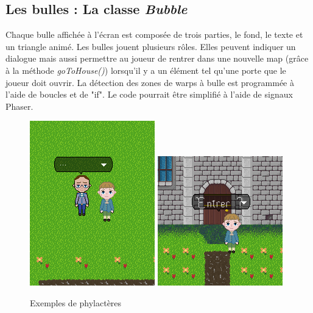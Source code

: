 \documentclass[11pt]{article}
\begin{document}
\subsection{Les bulles : La classe \textit{Bubble}}
 Chaque bulle affichée à l'écran est composée de trois parties, le fond, le texte et un triangle animé. Les bulles jouent plusieurs rôles. Elles peuvent indiquer un dialogue mais aussi permettre au joueur de rentrer dans une nouvelle map (grâce à la méthode \textit{goToHouse()}) lorsqu'il y a un élément tel qu'une porte que le joueur doit ouvrir. La détection des zones de warps à bulle est programmée à l'aide de boucles et de "if". Le code pourrait être simplifié à l'aide de signaux Phaser.
\begin{figure}[H]
\includegraphics[scale=0.5]{bulleDialog}
\includegraphics[scale=0.5]{bulleMaison}
\centering
\caption{Exemples de phylactères}
\end{figure}
\end{document}
